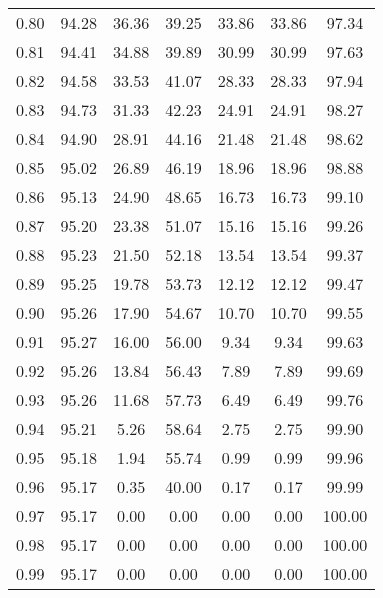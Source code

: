\begin{tabular}{|c|c|c|c|c|c|c|}
      0.80 &     94.28 &     36.36 &      39.25 &   33.86 &      33.86 &         97.34 \\
      0.81 &     94.41 &     34.88 &      39.89 &   30.99 &      30.99 &         97.63 \\
      0.82 &     94.58 &     33.53 &      41.07 &   28.33 &      28.33 &         97.94 \\
      0.83 &     94.73 &     31.33 &      42.23 &   24.91 &      24.91 &         98.27 \\
      0.84 &     94.90 &     28.91 &      44.16 &   21.48 &      21.48 &         98.62 \\
      0.85 &     95.02 &     26.89 &      46.19 &   18.96 &      18.96 &         98.88 \\
      0.86 &     95.13 &     24.90 &      48.65 &   16.73 &      16.73 &         99.10 \\
      0.87 &     95.20 &     23.38 &      51.07 &   15.16 &      15.16 &         99.26 \\
      0.88 &     95.23 &     21.50 &      52.18 &   13.54 &      13.54 &         99.37 \\
      0.89 &     95.25 &     19.78 &      53.73 &   12.12 &      12.12 &         99.47 \\
      0.90 &     95.26 &     17.90 &      54.67 &   10.70 &      10.70 &         99.55 \\
      0.91 &     95.27 &     16.00 &      56.00 &    9.34 &       9.34 &         99.63 \\
      0.92 &     95.26 &     13.84 &      56.43 &    7.89 &       7.89 &         99.69 \\
      0.93 &     95.26 &     11.68 &      57.73 &    6.49 &       6.49 &         99.76 \\
      0.94 &     95.21 &      5.26 &      58.64 &    2.75 &       2.75 &         99.90 \\
      0.95 &     95.18 &      1.94 &      55.74 &    0.99 &       0.99 &         99.96 \\
      0.96 &     95.17 &      0.35 &      40.00 &    0.17 &       0.17 &         99.99 \\
      0.97 &     95.17 &      0.00 &       0.00 &    0.00 &       0.00 &        100.00 \\
      0.98 &     95.17 &      0.00 &       0.00 &    0.00 &       0.00 &        100.00 \\
      0.99 &     95.17 &      0.00 &       0.00 &    0.00 &       0.00 &        100.00 \\
\bottomrule
\end{tabular}
